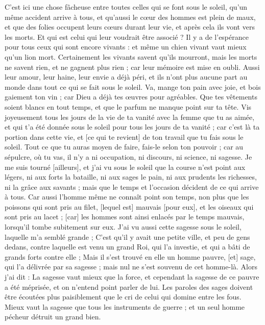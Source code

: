 \begin{multicols}{2}
C'est ici une chose fâcheuse entre toutes celles qui se font sous le soleil, qu'un même accident arrive à tous, et qu'aussi le cœur des hommes est plein de maux, et que des folies occupent leurs cœurs durant leur vie, et après cela ils vont vers les morts.
Et qui est celui qui leur voudrait être associé ? Il y a de l'espérance pour tous ceux qui sont encore vivants : et même un chien vivant vaut mieux qu'un lion mort.
Certainement les vivants savent qu'ils mourront, mais les morts ne savent rien, et ne gagnent plus rien ; car leur mémoire est mise en oubli.
Aussi leur amour, leur haine, leur envie a déjà péri, et ils n'ont plus aucune part au monde dans tout ce qui se fait sous le soleil.
Va, mange ton pain avec joie, et bois gaiement ton vin ; car Dieu a déjà tes œuvres pour agréables.
Que tes vêtements soient blancs en tout temps, et que le parfum ne manque point sur ta tête.
Vis joyeusement tous les jours de la vie de ta vanité avec la femme que tu as aimée, et qui t'a été donnée sous le soleil pour tous les jours de ta vanité ; car c'est là ta portion dans cette vie, et [ce qui te revient] de ton travail que tu fais sous le soleil.
Tout ce que tu auras moyen de faire, fais-le selon ton pouvoir ; car au sépulcre, où tu vas, il n'y a ni occupation, ni discours, ni science, ni sagesse.
Je me suis tourné [ailleurs], et j'ai vu sous le soleil que la course n'est point aux légers, ni aux forts la bataille, ni aux sages le pain, ni aux prudents les richesses, ni la grâce aux savants ; mais que le temps et l'occasion décident de ce qui arrive à tous.
Car aussi l'homme même ne connaît point son temps, non plus que les poissons qui sont pris au filet, [lequel est] mauvais [pour eux], et les oiseaux qui sont pris au lacet ; [car] les hommes sont ainsi enlacés par le temps mauvais, lorsqu'il tombe subitement sur eux.
J'ai vu aussi cette sagesse sous le soleil, laquelle m'a semblé grande ;
C'est qu'il y avait une petite ville, et peu de gens dedans, contre laquelle est venu un grand Roi, qui l'a investie, et qui a bâti de grands forts contre elle ;
Mais il s'est trouvé en elle un homme pauvre, [et] sage, qui l'a délivrée par sa sagesse ; mais nul ne s'est souvenu de cet homme-là.
Alors j'ai dit : La sagesse vaut mieux que la force, et cependant la sagesse de ce pauvre a été méprisée, et on n'entend point parler de lui.
Les paroles des sages doivent être écoutées plus paisiblement que le cri de celui qui domine entre les fous.
Mieux vaut la sagesse que tous les instruments de guerre ; et un seul homme pécheur détruit un grand bien.

\end{multicols}
